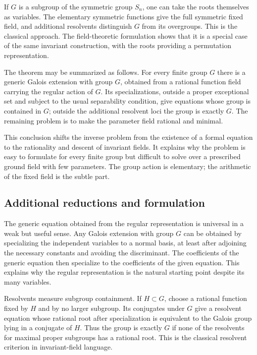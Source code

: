 \documentclass[11pt]{article}
\begin{document}
If \(G\) is a subgroup of the symmetric group \(S_n\), one can take the roots themselves as
variables. The elementary symmetric functions give the full symmetric fixed field, and additional
resolvents distinguish \(G\) from its overgroups. This is the classical approach. The
field-theoretic formulation shows that it is a special case of the same invariant construction, with
the roots providing a permutation representation.


The theorem may be summarized as follows. For every finite group \(G\) there is a generic Galois
extension with group \(G\), obtained from a rational function field carrying the regular action of
\(G\). Its specializations, outside a proper exceptional set and subject to the usual separability
condition, give equations whose group is contained in \(G\); outside the additional resolvent loci
the group is exactly \(G\). The remaining problem is to make the parameter field rational and
minimal.


This conclusion shifts the inverse problem from the existence of a formal equation to the
rationality and descent of invariant fields. It explains why the problem is easy to formulate for
every finite group but difficult to solve over a prescribed ground field with few parameters. The
group action is elementary; the arithmetic of the fixed field is the subtle part.


\subsection{Additional reductions and formulation}

The generic equation obtained from the regular representation is universal in a weak but useful
sense. Any Galois extension with group \(G\) can be obtained by specializing the independent
variables to a normal basis, at least after adjoining the necessary constants and avoiding the
discriminant. The coefficients of the generic equation then specialize to the coefficients of the
given equation. This explains why the regular representation is the natural starting point despite
its many variables.

Resolvents measure subgroup containment. If \(H\subset G\), choose a rational function fixed by
\(H\) and by no larger subgroup. Its conjugates under \(G\) give a resolvent equation whose rational
root after specialization is equivalent to the Galois group lying in a conjugate of \(H\). Thus the
group is exactly \(G\) if none of the resolvents for maximal proper subgroups has a rational root.
This is the classical resolvent criterion in invariant-field language.
\end{document}
